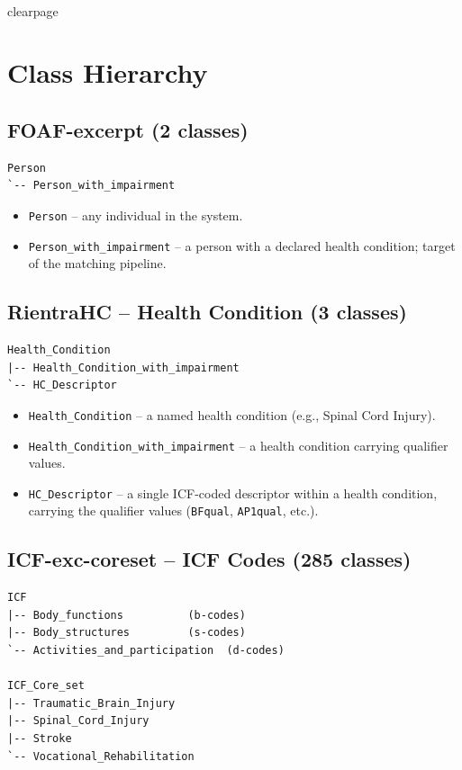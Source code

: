 ﻿\documentclass[12pt,a4paper]{article}
\begin{document}
\\clearpage
\section{Class Hierarchy}

\subsection{FOAF-excerpt (2 classes)}
\begin{lstlisting}
Person
`-- Person_with_impairment
\end{lstlisting}
\begin{itemize}
  \item \texttt{Person} -- any individual in the system.
  \item \texttt{Person\_with\_impairment} -- a person with a declared health condition; target of the matching pipeline.
\end{itemize}

\subsection{RientraHC -- Health Condition (3 classes)}
\begin{lstlisting}
Health_Condition
|-- Health_Condition_with_impairment
`-- HC_Descriptor
\end{lstlisting}
\begin{itemize}
  \item \texttt{Health\_Condition} -- a named health condition (e.g., Spinal Cord Injury).
  \item \texttt{Health\_Condition\_with\_impairment} -- a health condition carrying qualifier values.
  \item \texttt{HC\_Descriptor} -- a single ICF-coded descriptor within a health condition, carrying the qualifier values (\texttt{BFqual}, \texttt{AP1qual}, etc.).
\end{itemize}

\subsection{ICF-exc-coreset -- ICF Codes (285 classes)}
\begin{lstlisting}
ICF
|-- Body_functions          (b-codes)
|-- Body_structures         (s-codes)
`-- Activities_and_participation  (d-codes)

ICF_Core_set
|-- Traumatic_Brain_Injury
|-- Spinal_Cord_Injury
|-- Stroke
`-- Vocational_Rehabilitation
\end{lstlisting}
\end{document}

